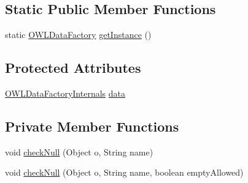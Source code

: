 \subsection*{Static Public Member Functions}
\begin{DoxyCompactItemize}
\item 
static \hyperlink{interfaceorg_1_1semanticweb_1_1owlapi_1_1model_1_1_o_w_l_data_factory}{O\-W\-L\-Data\-Factory} \hyperlink{classuk_1_1ac_1_1manchester_1_1cs_1_1owl_1_1owlapi_1_1_o_w_l_data_factory_impl_a7aa2da611ebafe184c2a9b52b82e986a}{get\-Instance} ()
\end{DoxyCompactItemize}
\subsection*{Protected Attributes}
\begin{DoxyCompactItemize}
\item 
\hyperlink{interfaceuk_1_1ac_1_1manchester_1_1cs_1_1owl_1_1owlapi_1_1_o_w_l_data_factory_internals}{O\-W\-L\-Data\-Factory\-Internals} \hyperlink{classuk_1_1ac_1_1manchester_1_1cs_1_1owl_1_1owlapi_1_1_o_w_l_data_factory_impl_abebc039b96fe38b5852dc690650bcf36}{data}
\end{DoxyCompactItemize}
\subsection*{Private Member Functions}
\begin{DoxyCompactItemize}
\item 
void \hyperlink{classuk_1_1ac_1_1manchester_1_1cs_1_1owl_1_1owlapi_1_1_o_w_l_data_factory_impl_a18fc1143f43fd8bbef008c253f18a3ad}{check\-Null} (Object o, String name)
\item 
void \hyperlink{classuk_1_1ac_1_1manchester_1_1cs_1_1owl_1_1owlapi_1_1_o_w_l_data_factory_impl_ab3221535eee68db5fd4794debd75e979}{check\-Null} (Object o, String name, boolean empty\-Allowed)
\end{DoxyCompactItemize}
